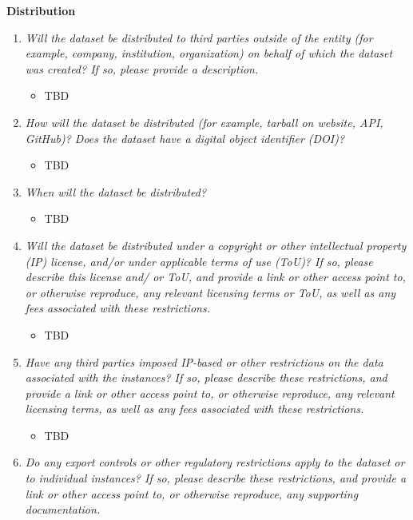 \documentclass[
  letterpaper,
  DIV=11,
  numbers=noendperiod]{scrartcl}
\providecommand{\tightlist}{%
  \setlength{\itemsep}{0pt}\setlength{\parskip}{0pt}}\usepackage{longtable,booktabs,array}
\begin{document}
\textbf{Distribution}

\begin{enumerate}
\def\labelenumi{\arabic{enumi}.}
\tightlist
\item
  \emph{Will the dataset be distributed to third parties outside of the
  entity (for example, company, institution, organization) on behalf of
  which the dataset was created? If so, please provide a description.}

  \begin{itemize}
  \tightlist
  \item
    TBD
  \end{itemize}
\item
  \emph{How will the dataset be distributed (for example, tarball on
  website, API, GitHub)? Does the dataset have a digital object
  identifier (DOI)?}

  \begin{itemize}
  \tightlist
  \item
    TBD
  \end{itemize}
\item
  \emph{When will the dataset be distributed?}

  \begin{itemize}
  \tightlist
  \item
    TBD
  \end{itemize}
\item
  \emph{Will the dataset be distributed under a copyright or other
  intellectual property (IP) license, and/or under applicable terms of
  use (ToU)? If so, please describe this license and/ or ToU, and
  provide a link or other access point to, or otherwise reproduce, any
  relevant licensing terms or ToU, as well as any fees associated with
  these restrictions.}

  \begin{itemize}
  \tightlist
  \item
    TBD
  \end{itemize}
\item
  \emph{Have any third parties imposed IP-based or other restrictions on
  the data associated with the instances? If so, please describe these
  restrictions, and provide a link or other access point to, or
  otherwise reproduce, any relevant licensing terms, as well as any fees
  associated with these restrictions.}

  \begin{itemize}
  \tightlist
  \item
    TBD
  \end{itemize}
\item
  \emph{Do any export controls or other regulatory restrictions apply to
  the dataset or to individual instances? If so, please describe these
  restrictions, and provide a link or other access point to, or
  otherwise reproduce, any supporting documentation.}


\end{enumerate}
\end{document}
